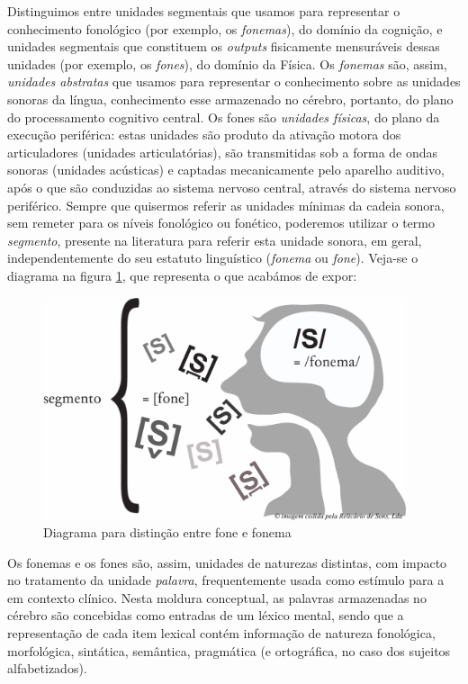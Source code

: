 \documentclass[output=paper]{LSP/langsci}
\begin{document}
Distinguimos entre unidades segmentais que usamos para representar o conhecimento fonológico (por exemplo, os \textit{fonemas}), do domínio da cognição, e unidades segmentais que constituem os \textit{outputs} fisicamente mensuráveis dessas unidades (por exemplo, os \textit{fones}), do domínio da Física. Os \textit{fonemas} são, assim, \textit{unidades abstratas} que usamos para representar o conhecimento sobre as unidades sonoras da língua, conhecimento esse armazenado no cérebro, portanto, do plano do processamento cognitivo central. Os fones são \textit{unidades físicas}, do plano da execução periférica: estas unidades são produto da ativação motora dos articuladores (unidades articulatórias), são transmitidas sob a forma de ondas sonoras (unidades acústicas) e captadas mecanicamente pelo aparelho auditivo, após o que são conduzidas ao sistema nervoso central, através do sistema nervoso periférico. Sempre que quisermos referir as unidades mínimas da cadeia sonora, sem remeter para os níveis fonológico ou fonético, poderemos utilizar o termo \textit{segmento}, presente na literatura para referir esta unidade sonora, em geral, independentemente do seu estatuto linguístico (\textit{fonema} ou \textit{fone}). Veja-se o diagrama na figura \ref{fig:lousada_1}, que representa o que acabámos de expor:

\begin{figure}
\includegraphics[width=0.95\textwidth]{figures/lousada_fig1}
\caption{Diagrama para distinção entre fone e fonema }
\label{fig:lousada_1}
\end{figure}

Os fonemas e os fones são, assim, unidades de naturezas distintas, com impacto no tratamento da unidade \textit{palavra}, frequentemente usada como estímulo para a  em contexto clínico. Nesta moldura conceptual, as palavras armazenadas no cérebro são concebidas como entradas de um léxico mental, sendo que a representação de cada item lexical contém informação de natureza fonológica, morfológica, sintática, semântica, pragmática (e ortográfica, no caso dos sujeitos alfabetizados). 
\end{document}

